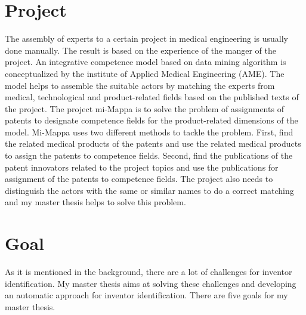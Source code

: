 \section{Project}
The assembly of experts to a certain project in medical engineering is usually done manually. The result is based on the experience of the manger of the project. An integrative competence model based on data mining algorithm is conceptualized by the institute  of Applied Medical Engineering (AME). The model helps to assemble the suitable actors by matching the experts from medical, technological and product-related fields based on the published texts of the project. The project mi-Mappa is to solve the problem of assignments of patents to designate competence fields for the product-related dimensions of the model. Mi-Mappa uses two different methods to tackle the problem. First, find the related medical products of the patents and use the related medical products to assign the patents to competence fields. Second, find the publications of the patent innovators related to the project topics and use the publications for assignment of the patents to competence fields. The project also needs to distinguish the actors with the same or similar names to do a correct matching and my master thesis helps to solve this problem.

\section{Goal}
As it is mentioned in the background, there are a lot of challenges for inventor identification. My master thesis aims at solving these challenges and developing an automatic approach for inventor identification. There are five goals for my master thesis. 


